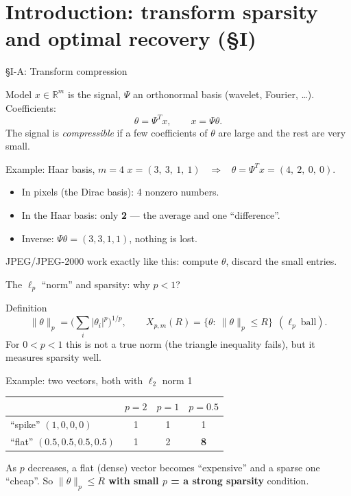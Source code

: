 \documentclass[aspectratio=169,11pt]{beamer}
\newcommand{\en}[1]{\textit{#1}}          %
\newcommand{\norm}[1]{\lVert #1\rVert}
\begin{document}
\section{Introduction: transform sparsity and optimal recovery (\S I)}

\begin{frame}{\S I-A: Transform compression}
  \begin{block}{Model}
    $x\in\mathbb{R}^m$ is the signal, $\Psi$ an orthonormal basis (wavelet, Fourier, \dots). Coefficients:
    \[ \theta=\Psi^{T}x,\qquad x=\Psi\theta . \]
    The signal is \en{compressible} if a few coefficients of $\theta$ are large and the rest are very small.
  \end{block}
  \begin{exampleblock}{Example: Haar basis, $m=4$}
    $x=(3,\ 3,\ 1,\ 1)$ \ $\Longrightarrow$ \ $\theta=\Psi^Tx=(4,\ 2,\ 0,\ 0)$.
    \begin{itemize}
      \item In pixels (the Dirac basis): 4 nonzero numbers.
      \item In the Haar basis: only \textbf{2} --- the average and one ``difference''.
      \item Inverse: $\Psi\theta=(3,3,1,1)$, nothing is lost.
    \end{itemize}
  \end{exampleblock}
  {\small JPEG/JPEG-2000 work exactly like this: compute $\theta$, discard the small entries.}
\end{frame}

\begin{frame}{The $\ell_p$ ``norm'' and sparsity: why $p<1$?}
  \begin{block}{Definition}
    \[ \norm{\theta}_p=\Big(\sum_i|\theta_i|^p\Big)^{1/p},\qquad X_{p,m}(R)=\{\theta:\ \norm{\theta}_p\le R\}\ \ (\ell_p\ \text{ball}). \]
    For $0<p<1$ this is not a true norm (the triangle inequality fails), but it measures sparsity well.
  \end{block}
  \begin{exampleblock}{Example: two vectors, both with $\ell_2$ norm 1}
    \centering
    \begin{tabular}{@{}lccc@{}}
      \toprule
      & $p=2$ & $p=1$ & $p=0.5$ \\
      \midrule
      ``spike'' $(1,0,0,0)$ & 1 & 1 & 1 \\
      ``flat'' $(0.5,0.5,0.5,0.5)$ & 1 & 2 & \textbf{8} \\
      \bottomrule
    \end{tabular}
  \end{exampleblock}
  As $p$ decreases, a flat (dense) vector becomes ``expensive'' and a sparse one ``cheap''.
  So \textbf{$\norm{\theta}_p\le R$ with small $p$ = a strong sparsity} condition.
\end{frame}
\end{document}
